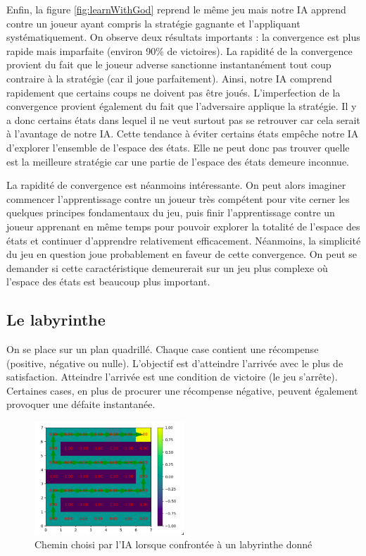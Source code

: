 Enfin, la figure \ref{fig:learnWithGod} reprend le même jeu mais notre IA apprend contre un joueur ayant compris la stratégie gagnante et l'appliquant systématiquement.
On observe deux résultats importants : la convergence est plus rapide mais imparfaite (environ 90\% de victoires). La rapidité de la convergence provient du fait
que le joueur adverse sanctionne instantanément tout coup contraire à la stratégie (car il joue parfaitement). Ainsi, notre IA comprend rapidement que certains coups 
ne doivent pas être joués. L'imperfection de la convergence provient également du fait que l'adversaire applique la stratégie. Il y a donc certains états dans lequel
il ne veut surtout pas se retrouver car cela serait à l'avantage de notre IA. Cette tendance à éviter certains états empêche notre IA d'explorer l'ensemble de l'espace 
des états. Elle ne peut donc pas trouver quelle est la meilleure stratégie car une partie de l'espace des états demeure inconnue.

La rapidité de convergence est néanmoins intéressante. On peut alors imaginer commencer l'apprentissage contre un joueur très compétent pour vite cerner les quelques
principes fondamentaux du jeu, puis finir l'apprentissage contre un joueur apprenant en même temps pour pouvoir explorer la totalité de l'espace des états et continuer
d'apprendre relativement efficacement. Néanmoins, la simplicité du jeu en question joue probablement en faveur de cette convergence. On peut se demander si cette 
caractéristique demeurerait sur un jeu plus complexe où l'espace des états est beaucoup plus important.


\subsection{Le labyrinthe}

On se place sur un plan quadrillé. Chaque case contient une récompense (positive, négative ou nulle). L'objectif est d'atteindre l'arrivée avec le plus de satisfaction.
Atteindre l'arrivée est une condition de victoire (le jeu s'arrête). Certaines cases, en plus de procurer une récompense négative, peuvent également provoquer une 
défaite instantanée. 

\begin{figure}[h]
 \centering
 \includegraphics[width = 0.5\textwidth]{img/labyrinthe.png}
 \caption{Chemin choisi par l'IA lorsque confrontée à un labyrinthe donné}
 \label{fig:labyrinthe}
\end{figure}

